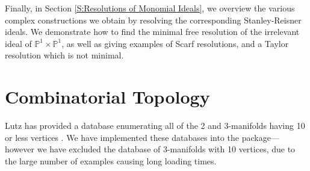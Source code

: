 \documentclass[12pt,leqno]{amsart}
\theoremstyle{definition}
\newcommand{\PP}{\ensuremath{\mathbb{P}}}
\begin{document}
Finally, in Section \ref{S:Resolutions of Monomial Ideals}, we overview the various complex constructions we obtain by resolving the corresponding Stanley-Reisner ideals. We demonstrate how to find the minimal free resolution of the irrelevant ideal of $\PP^1 \times \PP^1$, as well as giving examples of Scarf resolutions, and a Taylor resolution which is not minimal.

\section{Combinatorial Topology}
\label{S:Combinatorial Topology}

Lutz has provided a database enumerating all of the 2 and 3-manifolds having 10 or less vertices \cite{LutzM}. We have implemented these databases into the package---however we have excluded the database of 3-manifolds with 10 vertices, due to the large number of examples causing long loading times.
\end{document}
